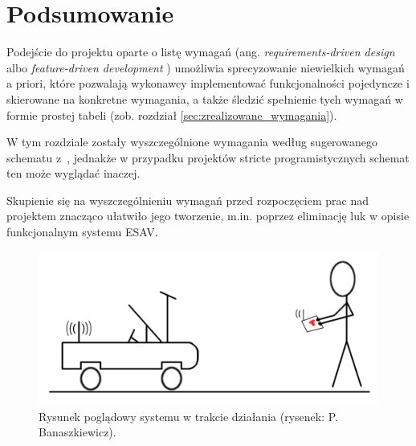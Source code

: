 
\section{Podsumowanie}
\label{sec:wstep_podsumowanie}

Podejście do projektu oparte o listę wymagań (ang. \textit{requirements-driven design} \cite{Hug10} albo \textit{feature-driven development} \cite{Goy08}) umożliwia sprecyzowanie niewielkich wymagań a priori, które pozwalają wykonawcy implementować funkcjonalności pojedyncze i skierowane na konkretne wymagania, a także śledzić spełnienie tych wymagań w formie prostej tabeli (zob. rozdział \ref{sec:zrealizowane_wymagania}).

W tym rozdziale zostały wyszczególnione wymagania według sugerowanego schematu z~\cite{Hug10}, jednakże w przypadku projektów stricte programistycznych schemat ten może wyglądać inaczej.

Skupienie się na wyszczególnieniu wymagań przed rozpoczęciem prac nad projektem znacząco ułatwiło jego tworzenie, m.in. poprzez eliminację luk w opisie funkcjonalnym systemu ESAV.

\begin{figure}[h]
	\centering
	\includegraphics[scale=0.3]{pics/preview_cartoon.png}
	\caption{\label{fig:preview}Rysunek poglądowy systemu w trakcie działania (rysenek: P. Banaszkiewicz).}
\end{figure}
